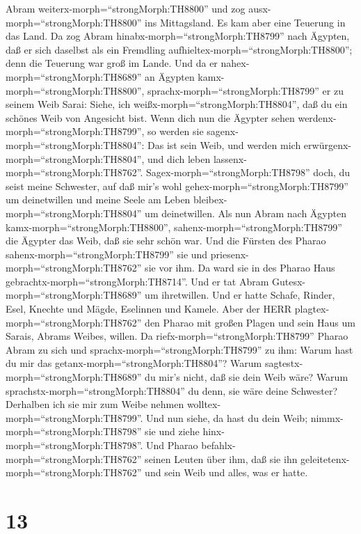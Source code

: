 Abram weiterx-morph=``strongMorph:TH8800'' und zog
ausx-morph=``strongMorph:TH8800'' ins Mittagsland.  Es kam
aber eine Teuerung in das Land. Da zog Abram
hinabx-morph=``strongMorph:TH8799'' nach Ägypten, daß er sich daselbst
als ein Fremdling aufhieltex-morph=``strongMorph:TH8800''; denn die
Teuerung war groß im Lande.  Und da er
nahex-morph=``strongMorph:TH8689'' an Ägypten
kamx-morph=``strongMorph:TH8800'', sprachx-morph=``strongMorph:TH8799''
er zu seinem Weib Sarai: Siehe, ich weißx-morph=``strongMorph:TH8804'',
daß du ein schönes Weib von Angesicht bist.  Wenn dich nun
die Ägypter sehen werdenx-morph=``strongMorph:TH8799'', so werden sie
sagenx-morph=``strongMorph:TH8804'': Das ist sein Weib, und werden mich
erwürgenx-morph=``strongMorph:TH8804'', und dich leben
lassenx-morph=``strongMorph:TH8762''. 
Sagex-morph=``strongMorph:TH8798'' doch, du seist meine Schwester, auf
daß mir's wohl gehex-morph=``strongMorph:TH8799'' um deinetwillen und
meine Seele am Leben bleibex-morph=``strongMorph:TH8804'' um
deinetwillen.  Als nun Abram nach Ägypten
kamx-morph=``strongMorph:TH8800'', sahenx-morph=``strongMorph:TH8799''
die Ägypter das Weib, daß sie sehr schön war.  Und die
Fürsten des Pharao sahenx-morph=``strongMorph:TH8799'' sie und
priesenx-morph=``strongMorph:TH8762'' sie vor ihm. Da ward sie in des
Pharao Haus gebrachtx-morph=``strongMorph:TH8714''.  Und er
tat Abram Gutesx-morph=``strongMorph:TH8689'' um ihretwillen. Und er
hatte Schafe, Rinder, Esel, Knechte und Mägde, Eselinnen und Kamele.
 Aber der HERR plagtex-morph=``strongMorph:TH8762'' den
Pharao mit großen Plagen und sein Haus um Sarais, Abrams Weibes, willen.
 Da riefx-morph=``strongMorph:TH8799'' Pharao Abram zu sich
und sprachx-morph=``strongMorph:TH8799'' zu ihm: Warum hast du mir das
getanx-morph=``strongMorph:TH8804''? Warum
sagtestx-morph=``strongMorph:TH8689'' du mir's nicht, daß sie dein Weib
wäre?  Warum sprachstx-morph=``strongMorph:TH8804'' du
denn, sie wäre deine Schwester? Derhalben ich sie mir zum Weibe nehmen
wolltex-morph=``strongMorph:TH8799''. Und nun siehe, da hast du dein
Weib; nimmx-morph=``strongMorph:TH8798'' sie und ziehe
hinx-morph=``strongMorph:TH8798''.  Und Pharao
befahlx-morph=``strongMorph:TH8762'' seinen Leuten über ihm, daß sie ihn
geleitetenx-morph=``strongMorph:TH8762'' und sein Weib und alles, was er
hatte.

\hypertarget{section-12}{%
\section{13}\label{section-12}}

